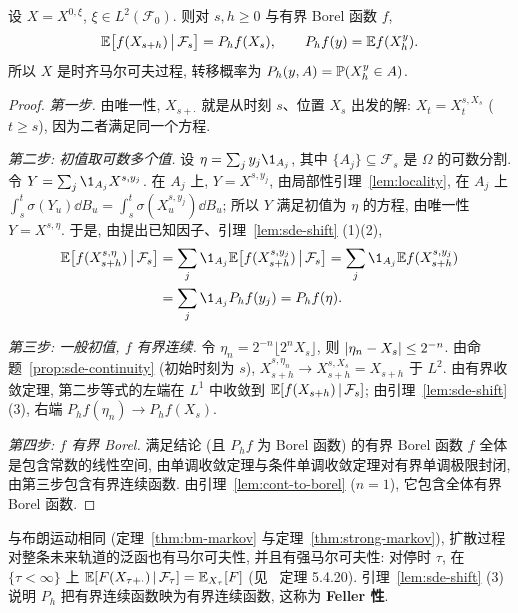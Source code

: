 \begin{theorem}[扩散过程的马尔可夫性]\label{thm:sde-markov}
设 $X=X^{0,\xi}$, $\xi\in L^2(\mathcal{F}_0)$. 则对 $s,h\ge0$ 与有界 Borel 函数 $f$,
\[
\E\big[f(X_{s+h})\,\big|\,\mathcal{F}_s\big]=P_hf(X_s),\qquad P_hf(y)=\E f(X^y_h).
\]
所以 $X$ 是时齐马尔可夫过程, 转移概率为 $P_h(y,A)=\P(X^y_h\in A)$.
\end{theorem}

\begin{proof}
\emph{第一步.} 由唯一性, $X_{s+\cdot}$ 就是从时刻 $s$、位置 $X_s$ 出发的解: $X_t=X^{s,X_s}_t$ ($t\ge s$), 因为二者满足同一个方程.

\emph{第二步: 初值取可数多个值.} 设 $\eta=\sum_jy_j\1_{A_j}$, 其中 $\{A_j\}\subseteq\mathcal{F}_s$ 是 $\Omega$ 的可数分割. 令 $Y=\sum_j\1_{A_j}X^{s,y_j}$. 在 $A_j$ 上, $Y=X^{s,y_j}$, 由局部性引理~\ref{lem:locality}, 在 $A_j$ 上 $\int_s^t\sigma(Y_u)\dd B_u=\int_s^t\sigma(X^{s,y_j}_u)\dd B_u$; 所以 $Y$ 满足初值为 $\eta$ 的方程, 由唯一性 $Y=X^{s,\eta}$. 于是, 由提出已知因子、引理~\ref{lem:sde-shift} (1)(2),
\begin{align*}
\E\big[f(X^{s,\eta}_{s+h})\,\big|\,\mathcal{F}_s\big]&=\sum_j\1_{A_j}\E\big[f(X^{s,y_j}_{s+h})\,\big|\,\mathcal{F}_s\big]=\sum_j\1_{A_j}\E f(X^{s,y_j}_{s+h})\\
&=\sum_j\1_{A_j}P_hf(y_j)=P_hf(\eta).
\end{align*}

\emph{第三步: 一般初值, $f$ 有界连续.} 令 $\eta_n=2^{-n}\lfloor2^nX_s\rfloor$, 则 $\abs{\eta_n-X_s}\le2^{-n}$. 由命题~\ref{prop:sde-continuity} (初始时刻为 $s$), $X^{s,\eta_n}_{s+h}\to X^{s,X_s}_{s+h}=X_{s+h}$ 于 $L^2$. 由有界收敛定理, 第二步等式的左端在 $L^1$ 中收敛到 $\E[f(X_{s+h})\,|\,\mathcal{F}_s]$; 由引理~\ref{lem:sde-shift} (3), 右端 $P_hf(\eta_n)\to P_hf(X_s)$.

\emph{第四步: $f$ 有界 Borel.} 满足结论 (且 $P_hf$ 为 Borel 函数) 的有界 Borel 函数 $f$ 全体是包含常数的线性空间, 由单调收敛定理与条件单调收敛定理对有界单调极限封闭, 由第三步包含有界连续函数. 由引理~\ref{lem:cont-to-borel} ($n=1$), 它包含全体有界 Borel 函数.
\end{proof}

与布朗运动相同 (定理~\ref{thm:bm-markov} 与定理~\ref{thm:strong-markov}), 扩散过程对整条未来轨道的泛函也有马尔可夫性, 并且有强马尔可夫性: 对停时 $\tau$, 在 $\{\tau<\infty\}$ 上 $\E[F(X_{\tau+\cdot})\,|\,\mathcal{F}_\tau]=\E_{X_\tau}[F]$ (见~\cite{karatzas} 定理 5.4.20). 引理~\ref{lem:sde-shift} (3) 说明 $P_h$ 把有界连续函数映为有界连续函数, 这称为 \textbf{Feller 性}.

